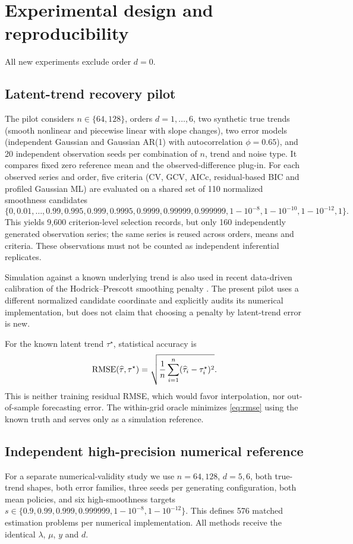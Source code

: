 \section{Experimental design and reproducibility}\label{sec:design}
All new experiments exclude order $d=0$.

\subsection{Latent-trend recovery pilot}
The pilot considers $n\in\{64,128\}$, orders $d=1,\ldots,6$, two synthetic true trends (smooth nonlinear and piecewise linear with slope changes), two error models (independent Gaussian and Gaussian AR(1) with autocorrelation $\phi=0.65$), and 20 independent observation seeds per combination of $n$, trend and noise type. It compares fixed zero reference mean and the observed-difference plug-in. For each observed series and order, five criteria (CV, GCV, AICc, residual-based BIC and profiled Gaussian ML) are evaluated on a shared set of 110 normalized smoothness candidates
\[
\{0,0.01,\ldots,0.99,0.995,0.999,0.9995,0.9999,
0.99999,0.999999,1-10^{-8},1-10^{-10},1-10^{-12},1\}.
\]
This yields 9,600 criterion-level selection records, but only 160 independently generated observation series; the same series is reused across orders, means and criteria. These observations must not be counted as independent inferential replicates.

Simulation against a known underlying trend is also used in recent data-driven calibration of the Hodrick--Prescott smoothing penalty \citep{franke2026}. The present pilot uses a different normalized candidate coordinate and explicitly audits its numerical implementation, but does not claim that choosing a penalty by latent-trend error is new.

For the known latent trend $\tau^\star$, statistical accuracy is
\begin{equation}\label{eq:rmse}
\operatorname{RMSE}(\widehat\tau,\tau^\star)
=\sqrt{\frac1n\sum_{i=1}^n(\widehat\tau_i-\tau^\star_i)^2}.
\end{equation}
This is neither training residual RMSE, which would favor interpolation, nor out-of-sample forecasting error. The within-grid oracle minimizes \eqref{eq:rmse} using the known truth and serves only as a simulation reference.

\subsection{Independent high-precision numerical reference}
For a separate numerical-validity study we use $n=64,128$, $d=5,6$, both true-trend shapes, both error families, three seeds per generating configuration, both mean policies, and six high-smoothness targets
$s\in\{0.9,0.99,0.999,0.999999,1-10^{-8},1-10^{-12}\}$. This defines 576 matched estimation problems per numerical implementation. All methods receive the identical $\lambda$, $\mu$, $y$ and $d$.

